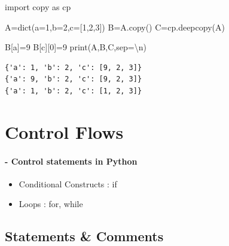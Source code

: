 \documentclass[
  a4paper,
  DIV=11,
  numbers=noendperiod]{scrreprt}
\newenvironment{Shaded}{\begin{snugshade}}{\end{snugshade}}
\newcommand{\BuiltInTok}[1]{\textcolor[rgb]{0.00,0.23,0.31}{#1}}
\newcommand{\CharTok}[1]{\textcolor[rgb]{0.13,0.47,0.30}{#1}}
\newcommand{\DecValTok}[1]{\textcolor[rgb]{0.68,0.00,0.00}{#1}}
\newcommand{\ImportTok}[1]{\textcolor[rgb]{0.00,0.46,0.62}{#1}}
\newcommand{\NormalTok}[1]{\textcolor[rgb]{0.00,0.23,0.31}{#1}}
\newcommand{\OperatorTok}[1]{\textcolor[rgb]{0.37,0.37,0.37}{#1}}
\newcommand{\StringTok}[1]{\textcolor[rgb]{0.13,0.47,0.30}{#1}}
\providecommand{\tightlist}{%
  \setlength{\itemsep}{0pt}\setlength{\parskip}{0pt}}\usepackage{longtable,booktabs,array}
\begin{document}
\begin{Shaded}
\begin{Highlighting}[]
\ImportTok{import}\NormalTok{ copy }\ImportTok{as}\NormalTok{ cp}
\end{Highlighting}
\end{Shaded}

\begin{Shaded}
\begin{Highlighting}[]
\NormalTok{A}\OperatorTok{=}\BuiltInTok{dict}\NormalTok{(a}\OperatorTok{=}\DecValTok{1}\NormalTok{,b}\OperatorTok{=}\DecValTok{2}\NormalTok{,c}\OperatorTok{=}\NormalTok{[}\DecValTok{1}\NormalTok{,}\DecValTok{2}\NormalTok{,}\DecValTok{3}\NormalTok{])}
\NormalTok{B}\OperatorTok{=}\NormalTok{A.copy()}
\NormalTok{C}\OperatorTok{=}\NormalTok{cp.deepcopy(A)}

\NormalTok{B[}\StringTok{\textquotesingle{}a\textquotesingle{}}\NormalTok{]}\OperatorTok{=}\DecValTok{9}
\NormalTok{B[}\StringTok{\textquotesingle{}c\textquotesingle{}}\NormalTok{][}\DecValTok{0}\NormalTok{]}\OperatorTok{=}\DecValTok{9}
\BuiltInTok{print}\NormalTok{(A,B,C,sep}\OperatorTok{=}\StringTok{\textquotesingle{}}\CharTok{\textbackslash{}n}\StringTok{\textquotesingle{}}\NormalTok{)}
\end{Highlighting}
\end{Shaded}

\begin{verbatim}
{'a': 1, 'b': 2, 'c': [9, 2, 3]}
{'a': 9, 'b': 2, 'c': [9, 2, 3]}
{'a': 1, 'b': 2, 'c': [1, 2, 3]}
\end{verbatim}

\chapter{Control Flows}\label{control-flows}

\subsubsection{- Control statements in
Python}\label{control-statements-in-python}

\begin{itemize}
\tightlist
\item
  Conditional Constructs : if
\item
  Loops : for, while
\end{itemize}

\section{Statements \& Comments}\label{statements-comments}
\end{document}
